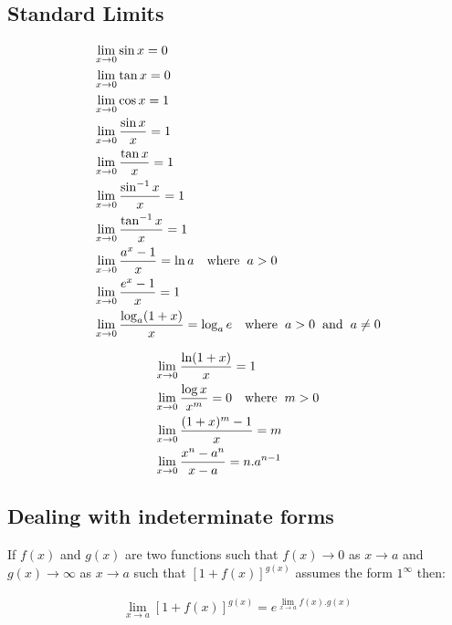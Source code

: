 \subsection{Standard Limits}
\vspace{-1mm}
\begin{align}
&\lim_{x \to 0} \sin x = 0 \\
&\lim_{x \to 0} \tan x = 0 \\
&\lim_{x \to 0} \cos x = 1 \\
&\lim_{x \to 0} \frac{\sin x}{x} = 1 \\
&\lim_{x \to 0} \frac{\tan x}{x} = 1 \\
&\lim_{x \to 0} \frac{\sin^{-1} x}{x} = 1 \\
&\lim_{x \to 0} \frac{\tan^{-1} x}{x} = 1 \\
&\lim_{x \to 0} \frac{a^x - 1}{x} = \ln a \quad \text{where} \hspace{2mm} a>0\\
&\lim_{x \to 0} \frac{e^x - 1}{x} = 1 \\
&\lim_{x \to 0} \frac{\log_a (1+x)}{x} = \log_a e \quad \text{where} \hspace{2mm} a>0 \hspace{2mm} \text{and} \hspace{2mm} a\neq0
\end{align}

\vspace{-2mm}

\begin{align}
&\lim_{x \to 0} \frac{\ln (1+x)}{x} = 1 \\
&\lim_{x \to 0} \frac{\log x}{x^m} = 0 \quad \text{where} \hspace{2mm} m>0 \\
&\lim_{x \to 0} \frac{(1+x)^m - 1}{x} = m \\
&\lim_{x \to 0} \frac{x^n - a^n}{x-a} = n.a^{n-1}
\end{align}

\subsection{Dealing with indeterminate forms}
If $f(x)$ and $g(x)$ are two functions such that $f(x)\rightarrow 0$ as $x \rightarrow a$ and $g(x) \rightarrow \infty$ as $x \rightarrow a$ such that $[1+f(x)]^{g(x)}$ assumes the form $1^\infty$ then:

\begin{tcolorbox}
\begin{center}
\begin{align*}
\lim_{x \to a}{[1+f(x)]}^{g(x)} = {e} ^ {\lim_{x \to a} f(x) . g(x)} 
\end{align*}
\end{center}
\end{tcolorbox} 

